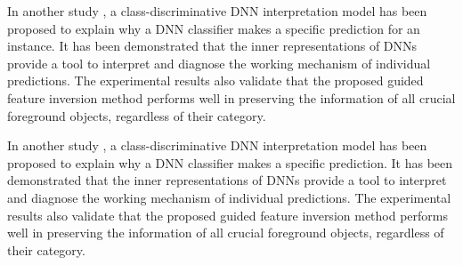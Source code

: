 In another study \cite{du2018towards}, a class-discriminative DNN interpretation model has been proposed to explain why a DNN classifier makes a specific prediction for an instance. It has been demonstrated that the inner representations of DNNs provide a tool to interpret and diagnose the working mechanism of individual predictions. The experimental results also validate that the proposed guided feature inversion method performs well in preserving the information of all crucial foreground objects, regardless of their category.

In another study \cite{du2018towards}, a class-discriminative DNN interpretation model has been proposed to explain why a DNN classifier makes a specific prediction. It has been demonstrated that the inner representations of DNNs provide a tool to interpret and diagnose the working mechanism of individual predictions. The experimental results also validate that the proposed guided feature inversion method performs well in preserving the information of all crucial foreground objects, regardless of their category.
